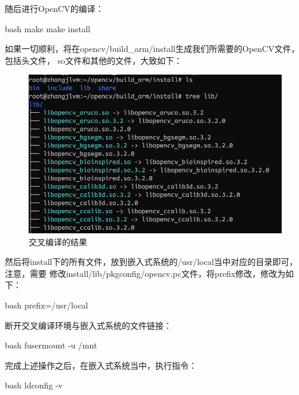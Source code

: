 \begin{outline}[enumerate]
随后进行OpenCV的编译：
\begin{code-in-enumerate}{bash}
make
make install
\end{code-in-enumerate}
如果一切顺利，将在opencv/build\_arm/install生成我们所需要的OpenCV文件，包括头文件，
so文件和其他的文件，大致如下：
\begin{figure}[H]
  \centering
  \includegraphics[width=\linewidth]{cross_finish.png}
  \caption{交叉编译的结果}
  \label{fig:cross_finish}
\end{figure}

然后将install下的所有文件，放到嵌入式系统的/usr/local当中对应的目录即可，注意，需要
修改install/lib/pkgconfig/opencv.pc文件，将prefix修改，修改为如下：
\begin{code-in-enumerate}{bash}
prefix=/usr/local
\end{code-in-enumerate}

断开交叉编译环境与嵌入式系统的文件链接：
\begin{code-in-enumerate}{bash}
fusermount -u /mnt
\end{code-in-enumerate}

完成上述操作之后，在嵌入式系统当中，执行指令：
\begin{code-in-enumerate}{bash}
ldconfig -v
\end{code-in-enumerate}


\end{outline}
